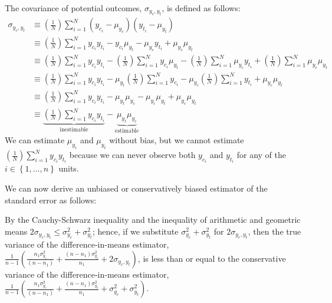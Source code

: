 \documentclass[12pt,leqno]{article}
\theoremstyle{newstyle}
\begin{document}
The covariance of potential outcomes, \(\sigma_{y_c, y_t}\), is defined
as follows: \begin{equation*}
\begin{split}
\sigma_{y_c, y_t} & \equiv \left(\frac{1}{N}\right) \sum \limits_{i = 1}^N \left(y_{c_i} - \mu_{y_c}\right)\left(y_{t_i} - \mu_{y_t}\right) \\
& \equiv \left(\frac{1}{N}\right) \sum \limits_{i = 1}^N y_{c_i} y_{t_i} - y_{c_i}\mu_{y_t} - \mu_{y_c}y_{t_i} + \mu_{y_c}\mu_{y_t} \\
& \equiv \left(\frac{1}{N}\right) \sum \limits_{i = 1}^N y_{c_i} y_{t_i} - \left(\frac{1}{N}\right) \sum \limits_{i = 1}^N y_{c_i}\mu_{y_t} - \left(\frac{1}{N}\right) \sum \limits_{i = 1}^N \mu_{y_c}y_{t_i} + \left(\frac{1}{N}\right) \sum \limits_{i = 1}^N \mu_{y_c}\mu_{y_t} \\
& \equiv \left(\frac{1}{N}\right) \sum \limits_{i = 1}^N y_{c_i} y_{t_i} - \mu_{y_t} \left(\frac{1}{N}\right) \sum \limits_{i = 1}^N y_{c_i} - \mu_{y_c}\left(\frac{1}{N}\right) \sum \limits_{i = 1}^N y_{t_i} + \mu_{y_c}\mu_{y_t} \\ 
& \equiv \left(\frac{1}{N}\right) \sum \limits_{i = 1}^N y_{c_i} y_{t_i} - \mu_{y_t} \mu_{y_c} - \mu_{y_c}\mu_{y_t} + \mu_{y_c}\mu_{y_t} \\ 
& \equiv \underbrace{\left(\frac{1}{N}\right) \sum \limits_{i = 1}^N y_{c_i} y_{t_i}}_{\text{inestimable}} - \underbrace{\mu_{y_t} \mu_{y_c}}_{\text{estimable}}
\end{split}
\end{equation*} We can estimate \(\mu_{y_c}\) and \(\mu_{y_t}\) without
bias, but we cannot estimate
\(\left(\frac{1}{N}\right) \sum \limits_{i = 1}^N y_{c_i} y_{t_i}\)
because we can never observe both \(y_{c_i}\) and \(y_{t_i}\) for any of
the \(i \in \left\{1, \dots , n\right\}\) units.

We can now derive an unbiased or conservatively biased estimator of the
standard error as follows:

By the Cauchy-Schwarz inequality and the inequality of arithmetic and
geometric means
\(2\sigma_{y_c, y_t} \leq \sigma^2_{y_c} + \sigma^2_{y_t}\); hence, if
we substitute \(\sigma^2_{y_c} + \sigma^2_{y_t}\) for
\(2\sigma_{y_c, y_t}\), then the true variance of the
difference-in-means estimator,
\(\frac{1}{n - 1}\left(\frac{n_1 \sigma^2_{y_c}}{\left(n - n_1\right)} + \frac{\left(n - n_1\right) \sigma^2_{y_t}}{n_1} + 2\sigma_{y_c, y_t}\right)\),
is less than or equal to the conservative variance of the
difference-in-means estimator,
\(\frac{1}{n - 1}\left(\frac{n_1 \sigma^2_{y_c}}{\left(n - n_1\right)} + \frac{\left(n - n_1\right) \sigma^2_{y_t}}{n_1} + \sigma^2_{y_c} + \sigma^2_{y_t}\right)\).
\end{document}
